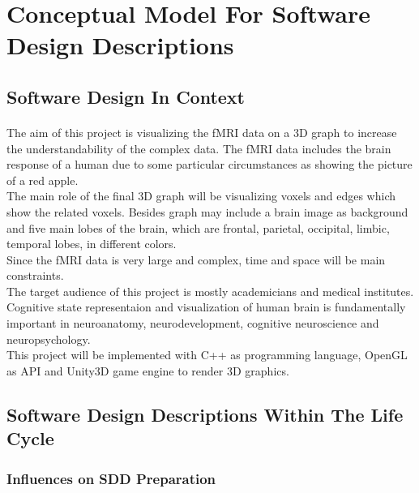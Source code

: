 
\newpage

\section{Conceptual Model For Software Design Descriptions }

\subsection{Software Design In Context}
\paragraph{}
\normalsize
The aim of this project is visualizing the fMRI data on a 3D graph to increase the understandability of the complex data. The fMRI data includes the brain response of a human due to some particular circumstances as showing the picture of a red apple.\\

The main role of the final 3D graph will be visualizing voxels and edges which show the related voxels. Besides graph may include a brain image as background and five main lobes of the brain,  which are frontal, parietal, occipital, limbic, temporal lobes, in different colors.\\
 
Since the fMRI data is very large and complex, time and space will be main constraints.\\

The target audience of this project is mostly academicians and medical institutes. Cognitive state representaion and visualization of human brain is fundamentally important in neuroanatomy, neurodevelopment, cognitive neuroscience and neuropsychology.\\

This project will be implemented with C++ as programming language, OpenGL as API and Unity3D game engine to render 3D graphics.
\skipsubsection
    

\subsection{Software Design Descriptions Within The Life Cycle}

\subsubsection{Influences on SDD Preparation}
